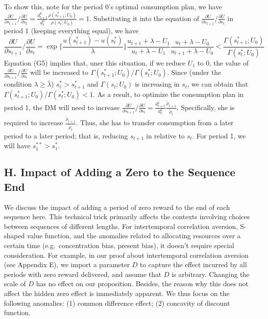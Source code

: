 \documentclass[
  12pt,
]{article}
\begin{document}
To show this, note for the period 0's optimal consumption plan, we have
\(\frac{\partial U}{\partial s_{t+1}}/\frac{\partial U}{\partial s_{t}}=\frac{d_{t+1}^0}{d_t^0}\frac{\rho(s_{t+1}^*;U_0)}{\rho(s_t^*;U_0)}=1\).
Substituting it into the equation of
\(\frac{\partial U}{\partial s_{t+1}}/\frac{\partial U}{\partial s_{t}}\)
in period 1 (keeping everything equal), we have\[
\tag{G5}
\frac{\partial U}{\partial s_{t+1}}/\frac{\partial U}{\partial s_{t}}
= \exp\{\frac{u(s_{t+1}^*)-u(s_t^*)}{\lambda}\}\frac{u_{t+1}+\lambda-U_1}{u_t+\lambda-U_1}
\frac{u_t+\lambda-U_0}{u_{t+1}+\lambda-U_0}<\frac{\Gamma(s_{t+1}^*;U_0)}{\Gamma(s_{t}^*;U_0)}
\]Equation (G5) implies that, uner this situation, if we reduce \(U_1\)
to 0, the value of
\(\frac{\partial U}{\partial s_{t+1}}/\frac{\partial U}{\partial s_{t}}\)
will be increased to \(\Gamma(s_{t+1}^*;U_0)/\Gamma(s_t^*;U_0)\). Since
(under the condition \(\lambda \geq \bar{\lambda}\)) \(s_t^*>s_{t+1}^*\)
and \(\Gamma(s_t;U_0)\) is increasing in \(s_t\), we can obtain that
\(\Gamma(s_{t+1}^*;U_0)/\Gamma(s_t^*;U_0)<1\). As a result, to optimize
the consumption plan in period 1, the DM will need to increase
\(\frac{\partial U}{\partial s_{t+1}}/\frac{\partial U}{\partial s_{t}}=\frac{d_{t+1}^1}{d_t^1}\frac{\tilde{\rho}_{t+1}}{\tilde{\rho}_t}\).
Specifically, she is required to increase
\(\frac{\tilde{\rho}_{t+1}}{\tilde{\rho}_t}\). Thus, she has to transfer
consumption from a later period to a later period; that is, reducing
\(s_{t+1}\) in relative to \(s_t\). For period 1, we will have
\(s_1^{**}>s_1^*\).

\hypertarget{h.-impact-of-adding-a-zero-to-the-sequence-end}{%
\subsection*{H. Impact of Adding a Zero to the Sequence
End}\label{h.-impact-of-adding-a-zero-to-the-sequence-end}}

We discuss the impact of adding a period of zero reward to the end of
each sequence here. This technical trick primarily affects the contexts
involving choices between sequences of different lengths. For
intertemporal correlation aversion, S-shaped value function, and the
anomalies related to allocating resources over a certain time
(e.g.~concentration bias, present bias), it doesn't require special
consideration. For example, in our proof about intertemporal correlation
aversion (see Appendix E), we import a parameter \(D\) to capture the
effect incurred by all periods with zero reward delivered, and assume
that \(D\) is arbitrary. Changing the scale of \(D\) has no effect on
our proposition. Besides, the reason why this does not affect the hidden
zero effect is immediately apparent. We thus focus on the following
anomalies: (1) common difference effect; (2) concavity of discount
function.
\end{document}
